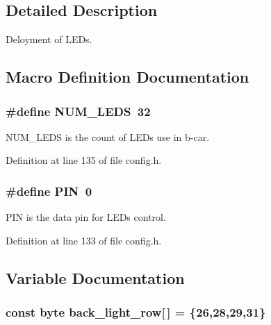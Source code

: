\subsection{Detailed Description}
Deloyment of L\+E\+Ds. 



\subsection{Macro Definition Documentation}
\subsubsection[{\texorpdfstring{N\+U\+M\+\_\+\+L\+E\+DS}{NUM_LEDS}}]{\setlength{\rightskip}{0pt plus 5cm}\#define N\+U\+M\+\_\+\+L\+E\+DS~32}\hypertarget{group__deployment_ga4c4ae9a4146ce8d6a5debc90300d9abd}{}\label{group__deployment_ga4c4ae9a4146ce8d6a5debc90300d9abd}
N\+U\+M\+\_\+\+L\+E\+DS is the count of L\+E\+Ds use in b-\/car. 

Definition at line 135 of file config.\+h.

\subsubsection[{\texorpdfstring{P\+IN}{PIN}}]{\setlength{\rightskip}{0pt plus 5cm}\#define P\+IN~0}\hypertarget{group__deployment_gae1a27401b7fb01ccb9a82dbddbb54eea}{}\label{group__deployment_gae1a27401b7fb01ccb9a82dbddbb54eea}
P\+IN is the data pin for L\+E\+Ds control. 

Definition at line 133 of file config.\+h.



\subsection{Variable Documentation}
\subsubsection[{\texorpdfstring{back\+\_\+light\+\_\+row}{back_light_row}}]{\setlength{\rightskip}{0pt plus 5cm}const byte back\+\_\+light\+\_\+row\mbox{[}$\,$\mbox{]} = \{26,28,29,31\}}\hypertarget{group__deployment_ga516415cfaebc59b71f822fb4cf86b22c}{}\label{group__deployment_ga516415cfaebc59b71f822fb4cf86b22c}


